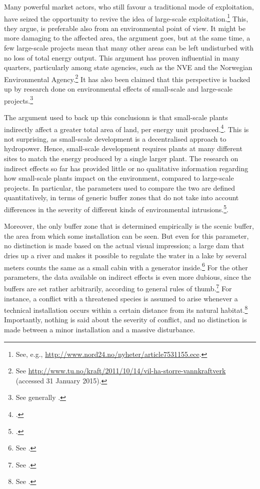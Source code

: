 Many powerful market actors, who still favour a traditional mode of exploitation, have seized the opportunity to revive the idea of large-scale exploitation.\footnote{See, e.g., \url{http://www.nord24.no/nyheter/article7531155.ece}.} This, they argue, is preferable also from an environmental point of view. It might be more damaging to the affected area, the argument goes, but at the same time, a few large-scale projects mean that many other areas can be left undisturbed with no loss of total energy output. This argument has proven influential in many quarters, particularly among state agencies, such as the NVE and the Norwegian Environmental Agency.\footnote{See \url{http://www.tu.no/kraft/2011/10/14/vil-ha-storre-vannkraftverk} (accessed 31 January 2015).} It has also been claimed that this perspective is backed up by research done on environmental effects of small-scale and large-scale projects.\footnote{See generally \cite{bakken12,bakken14}.} 

The argument used to back up this conclusionn is that small-scale plants indirectly affect a greater total area of land, per energy unit produced.\footcite[96-99]{bakken14}. This is not surprising, as small-scale development is a decentralised approach to hydropower. Hence, small-scale development requires plants at many different sites to match the energy produced by a single larger plant. The research on indirect effects so far has provided little or no qualitative information regarding how small-scale plants impact on the environment, compared to large-scale projects. In particular, the parameters used to compare the two are defined quantitatively, in terms of generic buffer zones that do not take into account differences in the severity of different kinds of environmental intrusions.\footcite[95]{bakken14}.

Moreover, the only buffer zone that is determined empirically is the scenic buffer, the area from which some installation can be seen. But even for this parameter, no distinction is made based on the actual visual impression; a large dam that dries up a river and makes it possible to regulate the water in a lake by several meters counts the same as a small cabin with a generator inside.\footnote{See \cite[95]{bakken14}.} For the other parameters, the data available on indirect effects is even more dubious, since the buffers are set rather arbitrarily, according to general rules of thumb.\footnote{See \cite[95]{bakken14}.} For instance, a conflict with a threatened species is assumed to arise whenever a technical installation occurs within a certain distance from its natural habitat.\footnote{See \cite[95]{bakken14}.} Importantly, nothing is said about the severity of conflict, and no distinction is made between a minor installation and a massive disturbance.

